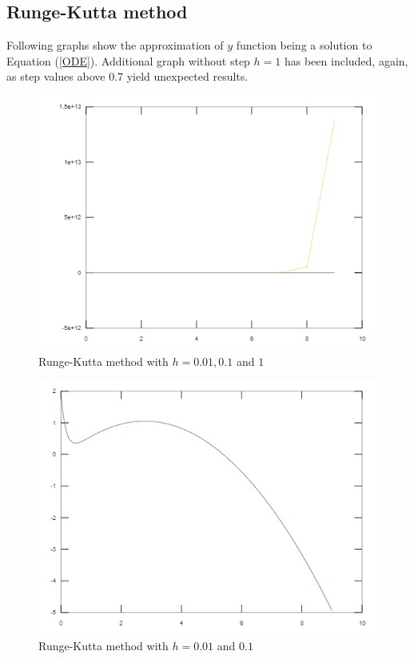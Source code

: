 \documentclass[a4paper,12pt]{article}
\begin{document}
\subsection{Runge-Kutta method}
Following graphs show the approximation of $y$ function being a solution to Equation (\ref{ODE}). Additional graph without step $h = 1$ has been included, again, as step values above 0.7 yield unexpected results.

\begin{figure}[H]
    \centering
    \includegraphics[width=\textwidth]{runge_kutta_all.png}
    \caption{Runge-Kutta method with $h = 0.01, 0.1$ and $1$}
    \label{fig:runge_kutta_all}
\end{figure}
\begin{figure}[H]
    \centering
    \includegraphics[width=\textwidth]{runge_kutta_two.png}
    \caption{Runge-Kutta method with $h = 0.01$ and $0.1$}
    \label{fig:runge_kutta_two}
\end{figure}
\end{document}
